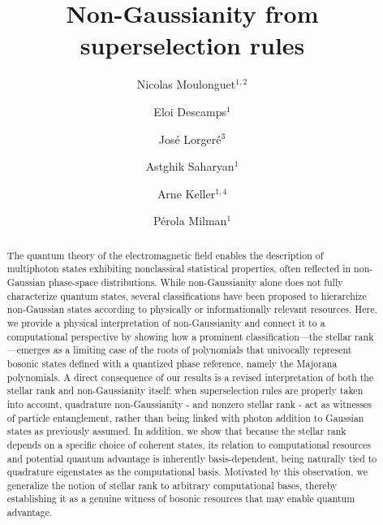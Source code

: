 \documentclass[aps,prl,showpacs,twocolumn]{revtex4-2}
\begin{document}
\title{Non-Gaussianity from superselection rules}

\author{Nicolas Moulonguet$^{1,2}$}
\author{Eloi Descamps$^{1}$}
\author{José Lorgeré$^3$}
\author{Astghik Saharyan$^{1}$}
\author{ Arne Keller$^{1,4}$}
\author{Pérola Milman$^{1}$ }



\begin{abstract}
The quantum theory of the electromagnetic field enables the description of multiphoton states exhibiting nonclassical statistical properties, often reflected in non-Gaussian phase-space distributions. While non-Gaussianity alone does not fully characterize quantum states, several classifications have been proposed to hierarchize non-Gaussian states according to physically or informationally relevant resources. Here, we provide a physical interpretation of non-Gaussianity and connect it to a computational perspective by showing how a prominent classification—the stellar rank—emerges as a limiting case of the roots of polynomials that univocally represent bosonic states defined with a quantized phase reference, namely the Majorana polynomials. A direct consequence of our results is a revised interpretation of both the stellar rank and non-Gaussianity itself: when superselection rules are properly taken into account, quadrature non-Gaussianity - and nonzero stellar rank - act as witnesses of particle entanglement, rather than being linked with photon addition to Gaussian states as previously assumed. In addition, we show that because the stellar rank depends on a specific choice of coherent states, its relation to computational resources and potential quantum advantage is inherently basis-dependent, being naturally tied to quadrature eigenstates as the computational basis. Motivated by this observation, we generalize the notion of stellar rank to arbitrary computational bases, thereby establishing it as a genuine witness of bosonic resources that may enable quantum advantage.
\end{abstract}
\end{document}
